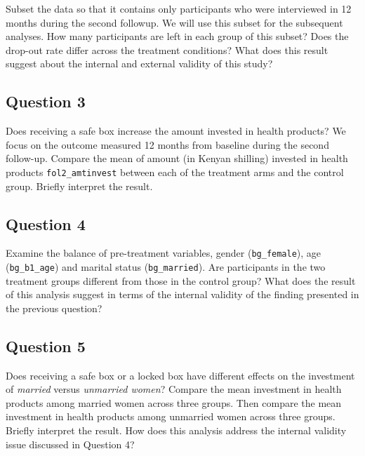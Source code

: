 \documentclass[]{article}
\begin{document}
Subset the data so that it contains only participants who were
interviewed in 12 months during the second followup. We will use this
subset for the subsequent analyses. How many participants are left in
each group of this subset? Does the drop-out rate differ across the
treatment conditions? What does this result suggest about the internal
and external validity of this study?

\subsection{Question 3}\label{question-3}

Does receiving a safe box increase the amount invested in health
products? We focus on the outcome measured 12 months from baseline
during the second follow-up. Compare the mean of amount (in Kenyan
shilling) invested in health products \texttt{fol2\_amtinvest} between
each of the treatment arms and the control group. Briefly interpret the
result.

\subsection{Question 4}\label{question-4}

Examine the balance of pre-treatment variables, gender
(\texttt{bg\_female}), age (\texttt{bg\_b1\_age}) and marital status
(\texttt{bg\_married}). Are participants in the two treatment groups
different from those in the control group? What does the result of this
analysis suggest in terms of the internal validity of the finding
presented in the previous question?

\subsection{Question 5}\label{question-5}

Does receiving a safe box or a locked box have different effects on the
investment of \emph{married} versus \emph{unmarried women}? Compare the
mean investment in health products among married women across three
groups. Then compare the mean investment in health products among
unmarried women across three groups. Briefly interpret the result. How
does this analysis address the internal validity issue discussed in
Question 4?
\end{document}
